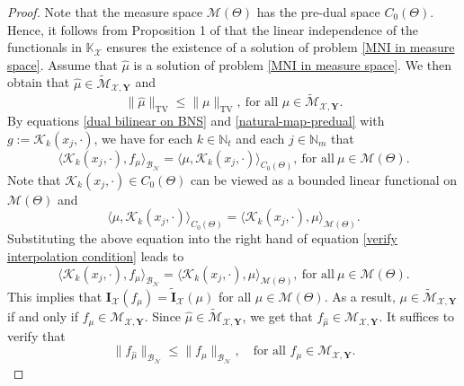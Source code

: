 \documentclass[11pt]{article}
\begin{document}
\begin{proof}
Note that the measure space $\mathcal{M}(\Theta)$ has the pre-dual space $C_0(\Theta)$. Hence, it follows from Proposition 1 of \cite{wang2021representer} that the linear independence of  the functionals in $\mathbb{K}_\mathcal{X}$ ensures the existence of a solution of problem \eqref{MNI in measure space}. Assume that ${\hat{\mu}}$ is a solution of problem \eqref{MNI in measure space}. We then obtain that ${\hat{\mu}}\in\widetilde{\mathcal{M}}_{\mathcal{X},\mathbf{Y}}$ and 
\begin{equation}\label{proof mu* is a solution}
        \|{\hat{\mu}}\|_{\mathrm{TV}}\leq\|\mu\|_{\mathrm{TV}},\ \text{for all }\mu\in\widetilde{\mathcal{M}}_{\mathcal{X},\mathbf{Y}}.
\end{equation} 
By equations \eqref{dual bilinear on BNS} and \eqref{natural-map-predual} with $g:=\mathcal{K}_k(x_j,\cdot)$, we have for each $k\in\mathbb{N}_t$ and each $j\in\mathbb{N}_{m}$ that
    \begin{equation}\label{verify interpolation condition}
    \langle \mathcal{K}_k(x_j,\cdot), f_{\mu}\rangle_{\mathcal{B}_{\mathcal{N}}}=\langle \mu,\mathcal{K}_k(x_j,\cdot)\rangle_{C_0(\Theta)}, \ \mbox{for all}\ \mu\in\mathcal{M}(\Theta).
    \end{equation}
    Note that $\mathcal{K}_k(x_j,\cdot)\in C_0(\Theta)$ can be viewed as a bounded linear functional on $\mathcal{M}(\Theta)$ and 
    $$\langle \mu,\mathcal{K}_k(x_j,\cdot)\rangle_{C_0(\Theta)}=\langle \mathcal{K}_k(x_j,\cdot),\mu\rangle_{\mathcal{M}(\Theta)}.
    $$ 
    Substituting the above equation into the right hand of equation \eqref{verify interpolation condition} leads to 
    $$
    \langle \mathcal{K}_k(x_j,\cdot), f_{\mu}\rangle_{\mathcal{B}_{\mathcal{N}}}=\langle \mathcal{K}_k(x_j,\cdot),\mu\rangle_{\mathcal{M}(\Theta)}, \ \mbox{for all}\ \mu\in\mathcal{M}(\Theta).
    $$
    This implies that $        \mathbf{I}_{\mathcal{X}}(f_{\mu})=\widetilde{\mathbf{I}}_{\mathcal{X}}(\mu)$ for all $\mu\in\mathcal{M}(\Theta)$. As a result,  
    $\mu\in\widetilde{\mathcal{M}}_{\mathcal{X},\mathbf{Y}}$ if and only if 
 $f_{\mu}\in\mathcal{M}_{\mathcal{X},\mathbf{Y}}$. Since ${\hat{\mu}}\in\widetilde{\mathcal{M}}_{\mathcal{X},\mathbf{Y}}$, we get that $f_{\hat\mu}\in\mathcal{M}_{\mathcal{X},\mathbf{Y}}$. It suffices to verify that 
  \begin{equation*}
\|f_{{\hat{\mu}}}\|_{\mathcal{B}_{\mathcal{N}}}\leq\|f_\mu\|_{\mathcal{B}_{\mathcal{N}}},\quad\text{for all }f_{\mu}\in{\mathcal{M}}_{\mathcal{X},\mathbf{Y}}.

\end{equation*}
\end{proof}
\end{document}

